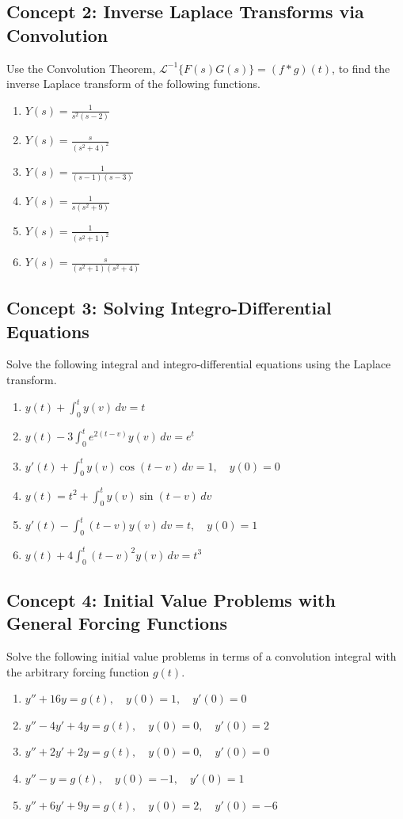 \documentclass[11pt, letterpaper]{article}
\theoremstyle{definition}
\theoremstyle{remark}
\begin{document}
\subsection{Concept 2: Inverse Laplace Transforms via Convolution}
Use the Convolution Theorem, $\mathcal{L}^{-1}\{F(s)G(s)\} = (f * g)(t)$, to find the inverse Laplace transform of the following functions.
\begin{enumerate}[label=\textbf{\arabic*.}, resume]
    \item $\displaystyle Y(s) = \frac{1}{s^2(s-2)}$
    \item $\displaystyle Y(s) = \frac{s}{(s^2+4)^2}$
    \item $\displaystyle Y(s) = \frac{1}{(s-1)(s-3)}$
    \item $\displaystyle Y(s) = \frac{1}{s(s^2+9)}$
    \item $\displaystyle Y(s) = \frac{1}{(s^2+1)^2}$
    \item $\displaystyle Y(s) = \frac{s}{(s^2+1)(s^2+4)}$
\end{enumerate}

\subsection{Concept 3: Solving Integro-Differential Equations}
Solve the following integral and integro-differential equations using the Laplace transform.
\begin{enumerate}[label=\textbf{\arabic*.}, resume]
    \item $\displaystyle y(t) + \int_0^t y(v) \, dv = t$
    \item $\displaystyle y(t) - 3 \int_0^t e^{2(t-v)}y(v) \, dv = e^t$
    \item $\displaystyle y'(t) + \int_0^t y(v)\cos(t-v) \, dv = 1, \quad y(0) = 0$
    \item $\displaystyle y(t) = t^2 + \int_0^t y(v)\sin(t-v) \, dv$
    \item $\displaystyle y'(t) - \int_0^t (t-v)y(v) \, dv = t, \quad y(0) = 1$
    \item $\displaystyle y(t) + 4 \int_0^t (t-v)^2 y(v) \, dv = t^3$
\end{enumerate}

\subsection{Concept 4: Initial Value Problems with General Forcing Functions}
Solve the following initial value problems in terms of a convolution integral with the arbitrary forcing function $g(t)$.
\begin{enumerate}[label=\textbf{\arabic*.}, resume]
    \item $y'' + 16y = g(t), \quad y(0) = 1, \quad y'(0) = 0$
    \item $y'' - 4y' + 4y = g(t), \quad y(0) = 0, \quad y'(0) = 2$
    \item $y'' + 2y' + 2y = g(t), \quad y(0) = 0, \quad y'(0) = 0$
    \item $y'' - y = g(t), \quad y(0) = -1, \quad y'(0) = 1$
    \item $y'' + 6y' + 9y = g(t), \quad y(0) = 2, \quad y'(0) = -6$
\end{enumerate}
\end{document}
